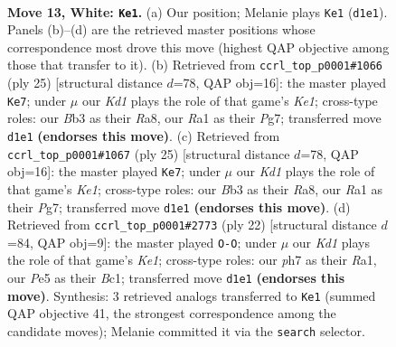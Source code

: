 \documentclass[11pt]{article}
\begin{document}
\clearpage

\begin{figure}[p]\centering
\begin{subfigure}{0.46\textwidth}\centering
\resizebox{\linewidth}{!}{%
\newchessgame
\chessboard[
  setfen={2kr2r1/ppp1ppbp/1nn3p1/4P3/6bP/NB3N2/PPP2PP1/R1BK2R1 w - - 1 13},
  showmover=false,
  pgfstyle=straightmove, color=movearrow, markmove={d1-e1}
]}
\caption{}
\end{subfigure}\hfill
\begin{subfigure}{0.46\textwidth}\centering
\resizebox{\linewidth}{!}{%
\newchessgame
\chessboard[
  setfen={r1b1k2r/1p3ppp/2n2n2/p3p3/Nb6/1N4P1/PP1BPPBP/R3K2R b KQkq - 5 13},
  showmover=false,
  pgfstyle=straightmove, color=movearrow, markmove={e8-e7}
]}
\caption{}
\end{subfigure}
\\[4pt]
\begin{subfigure}{0.46\textwidth}\centering
\resizebox{\linewidth}{!}{%
\newchessgame
\chessboard[
  setfen={r1b1k2r/1p3ppp/2n2n2/p3p3/Nb6/1N4P1/PP1BPPBP/R3K2R b KQkq - 3 13},
  showmover=false,
  pgfstyle=straightmove, color=movearrow, markmove={e8-e7}
]}
\caption{}
\end{subfigure}\hfill
\begin{subfigure}{0.46\textwidth}\centering
\resizebox{\linewidth}{!}{%
\newchessgame
\chessboard[
  setfen={r4rk1/1p1bppbp/1p3np1/2nP4/8/2N2NP1/PP2PPBP/R1B1K2R w KQ - 2 12},
  showmover=false,
  pgfstyle=straightmove, color=movearrow, markmove={e1-g1}
]}
\caption{}
\end{subfigure}
\caption{\textbf{Move 13, White: \texttt{Ke1}.} (a) Our position; Melanie plays \texttt{Ke1} (\texttt{d1e1}). Panels (b)--(d) are the retrieved master positions whose correspondence most drove this move (highest QAP objective among those that transfer to it). (b) Retrieved from \texttt{ccrl\_top\_p0001\#1066} (ply 25) [structural distance $d$=78, QAP obj=16]: the master played \texttt{Ke7}; under $\mu$ our \emph{Kd1} plays the role of that game's \emph{Ke1}; cross-type roles: our \emph{B}b3 as their \emph{R}a8, our \emph{R}a1 as their \emph{P}g7; transferred move \texttt{d1e1} \textbf{(endorses this move)}. (c) Retrieved from \texttt{ccrl\_top\_p0001\#1067} (ply 25) [structural distance $d$=78, QAP obj=16]: the master played \texttt{Ke7}; under $\mu$ our \emph{Kd1} plays the role of that game's \emph{Ke1}; cross-type roles: our \emph{B}b3 as their \emph{R}a8, our \emph{R}a1 as their \emph{P}g7; transferred move \texttt{d1e1} \textbf{(endorses this move)}. (d) Retrieved from \texttt{ccrl\_top\_p0001\#2773} (ply 22) [structural distance $d$=84, QAP obj=9]: the master played \texttt{O-O}; under $\mu$ our \emph{Kd1} plays the role of that game's \emph{Ke1}; cross-type roles: our \emph{p}h7 as their \emph{R}a1, our \emph{P}e5 as their \emph{B}c1; transferred move \texttt{d1e1} \textbf{(endorses this move)}. Synthesis: 3 retrieved analogs transferred to \texttt{Ke1} (summed QAP objective 41, the strongest correspondence among the candidate moves); Melanie committed it via the \texttt{search} selector.}
\label{fig:thought-m24}
\end{figure}
\end{document}
